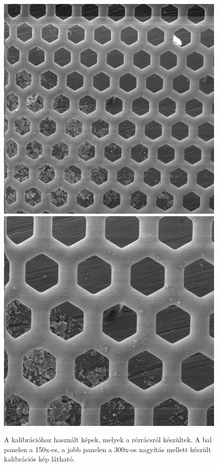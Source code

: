 \documentclass[12pt,a4paper]{article}
\begin{document}
\begin{figure}[!h]
\begin{center}
\includegraphics[width=0.45\linewidth]{E/E/008_s}
\hspace*{1cm}
\includegraphics[width=0.45\linewidth]{E/E/009_s}
\caption{A kalibrációhoz használt képek, melyek a rézrácsról készültek. A bal panelen a 150x-es, a jobb panelen a 300x-os nagyítás mellett készült kalibrációs kép látható.}
\label{fig:kalibs}
\end{center}
\end{figure}

\newpage
\end{document}
